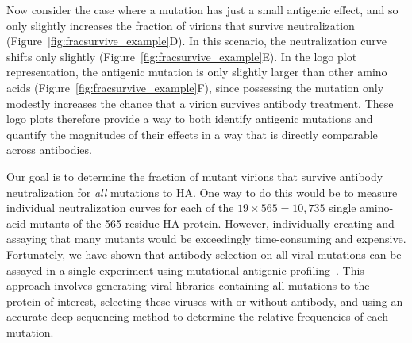 \documentclass[11pt]{article}
\begin{document}
Now consider the case where a mutation has just a small antigenic effect, and so only slightly increases the fraction of virions that survive neutralization (Figure~\ref{fig:fracsurvive_example}D).
In this scenario, the neutralization curve shifts only slightly (Figure~\ref{fig:fracsurvive_example}E).
In the logo plot representation, the antigenic mutation is only slightly larger than other amino acids (Figure~\ref{fig:fracsurvive_example}F), since possessing the mutation only modestly increases the chance that a virion survives antibody treatment.
These logo plots therefore provide a way to both identify antigenic mutations and quantify the magnitudes of their effects in a way that is directly comparable across antibodies.

Our goal is to determine the fraction of mutant virions that survive antibody neutralization for \emph{all} mutations to HA.
One way to do this would be to measure individual neutralization curves for each of the $19\times565 = 10,735$ single amino-acid mutants of the 565-residue HA protein.
However, individually creating and assaying that many mutants would be exceedingly time-consuming and expensive.
Fortunately, we have shown that antibody selection on all viral mutations can be assayed in a single experiment using mutational antigenic profiling~\citep{doud2017complete,dingens2017comprehensive}.
This approach involves generating viral libraries containing all mutations to the protein of interest, selecting these viruses with or without antibody, and using an accurate deep-sequencing method to determine the relative frequencies of each mutation.
\end{document}
